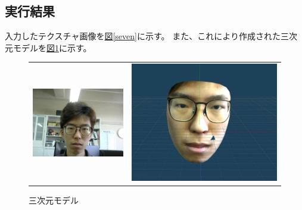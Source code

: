 \documentclass[]{jarticle}          %
\begin{document}
\subsection{実行結果}
入力したテクスチャ画像を\hyperref[seven]{図\ref{seven}}に示す。
また、これにより作成された三次元モデルを\hyperref[eight]{図\ref{eight}}に示す。
\begin{figure}[!ht]
  \begin{tabular}{cc}
    \begin{minipage}[t]{0.45\hsize}
      \centering
      \includegraphics[keepaspectratio, scale=0.2]{figures/texture.png}
      \caption{テクスチャ画像}
      \label{seven}
    \end{minipage} &
    \begin{minipage}[t]{0.45\hsize}
      \centering
      \includegraphics[keepaspectratio, scale=0.2]{figures/3dmodel.png}
      \caption{三次元モデル}
      \label{eight}
    \end{minipage}
  \end{tabular}
\end{figure}
\end{document}
